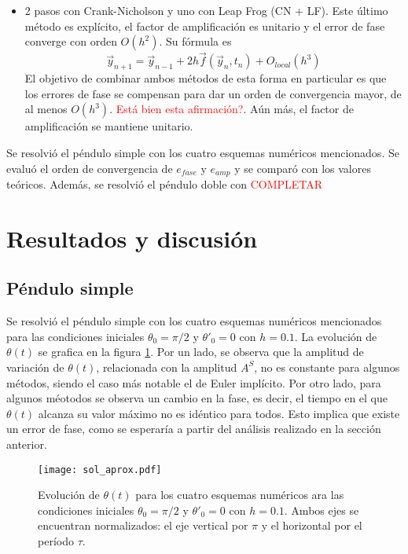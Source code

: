 \documentclass[aps,prb,twocolumn,superscriptaddress,floatfix,longbibliography]{revtex4-2}
\newif\ifptitle
\newif\ifpnumber
\newcounter{para}
\newcommand\ptitle[1]{\par\refstepcounter{para}
{\ifpnumber{\noindent\textcolor{lightgray}{\textbf{\thepara}}\indent}\fi}
{\ifptitle{\textbf{[{#1}]}}\fi}}
\begin{document}
\begin{itemize}
  \item 2 pasos con Crank-Nicholson y uno con Leap Frog (CN + LF). Este último método es explícito, el factor de amplificación es unitario y el error de fase converge con orden $O(h^2)$. Su fórmula es
  \begin{equation}
    \vec{y}_{n+1} = \vec{y}_{n-1} + 2 h \vec{f}(\vec{y}_n, t_n) + O_{local}(h^3)
    \label{eq:Leap_Frog}
  \end{equation}
  El objetivo de combinar ambos métodos de esta forma en particular es que los errores de fase se compensan para dar un orden de convergencia mayor, de al menos $O(h^3)$. \textcolor{red}{Está bien esta afirmación?}. Aún más, el factor de amplificación se mantiene unitario.


\end{itemize}

\ptitle{Resumen de lo que se hará. Qué se resuelve con qué}
Se resolvió el péndulo simple con los cuatro esquemas numéricos mencionados. Se evaluó el orden de convergencia de $e_{fase}$ y $e_{amp}$ y se comparó con los valores teóricos. Además, se resolvió el péndulo doble con \textcolor{red}{COMPLETAR}


\section{Resultados y discusión}

\subsection{Péndulo simple}

Se resolvió el péndulo simple con los cuatro esquemas numéricos mencionados para las condiciones iniciales $\theta_0 = \pi/2$ y $\theta'_0 = 0$ con $h = 0.1$. La evolución de $\theta(t)$ se grafica en la figura \ref{fig:sol_aprox}. Por un lado, se observa que la amplitud de variación de $\theta(t)$, relacionada con la amplitud $A^S$, no es constante para algunos métodos, siendo el caso más notable el de Euler implícito. Por otro lado, para algunos méotodos se observa un cambio en la fase, es decir, el tiempo en el que $\theta(t)$ alcanza su valor máximo no es idéntico para todos. Esto implica que existe un error de fase, como se esperaría a partir del análisis realizado en la sección anterior.


\begin{figure}[h]
  \texttt{[image: sol\_aprox.pdf]}
  \caption{Evolución de $\theta(t)$ para los cuatro esquemas numéricos ara las condiciones iniciales $\theta_0 = \pi/2$ y $\theta'_0 = 0$ con $h = 0.1$. Ambos ejes se encuentran normalizados: el eje vertical por $\pi$ y el horizontal por el período $\tau$.}
   \label{fig:sol_aprox}
\end{figure}
\end{document}
